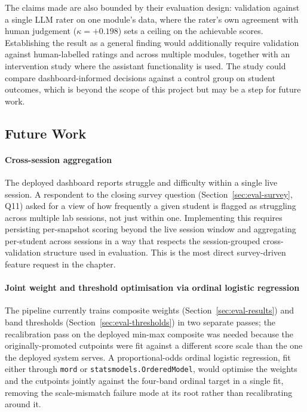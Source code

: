 The claims made are also bounded by their evaluation design: validation against a single LLM rater on one module's data, where the rater's own agreement with human judgement ($\kappa = +0.198$) sets a ceiling on the achievable scores. 
Establishing the result as a general finding would additionally require validation against human-labelled ratings and across multiple modules, together with an intervention study where the assistant functionality is used. 
The study could compare dashboard-informed decisions against a control group on student outcomes, which is beyond the scope of this project but may be a step for future work.

\subsection{Future Work}

\paragraph{Cross-session aggregation}
The deployed dashboard reports struggle and difficulty within a single live session.
A respondent to the closing survey question (Section~\ref{sec:eval-survey}, Q11) asked for a view of how frequently a given student is flagged as struggling across multiple lab sessions, not just within one.
Implementing this requires persisting per-snapshot scoring beyond the live session window and aggregating per-student across sessions in a way that respects the session-grouped cross-validation structure used in evaluation.
This is the most direct survey-driven feature request in the chapter.

\paragraph{Joint weight and threshold optimisation via ordinal logistic regression}
The pipeline currently trains composite weights (Section~\ref{sec:eval-results}) and band thresholds (Section~\ref{sec:eval-thresholds}) in two separate passes; the recalibration pass on the deployed min-max composite was needed because the originally-promoted cutpoints were fit against a different score scale than the one the deployed system serves.
A proportional-odds ordinal logistic regression, fit either through \texttt{mord} or \texttt{statsmodels.OrderedModel}, would optimise the weights and the cutpoints jointly against the four-band ordinal target in a single fit, removing the scale-mismatch failure mode at its root rather than recalibrating around it.

